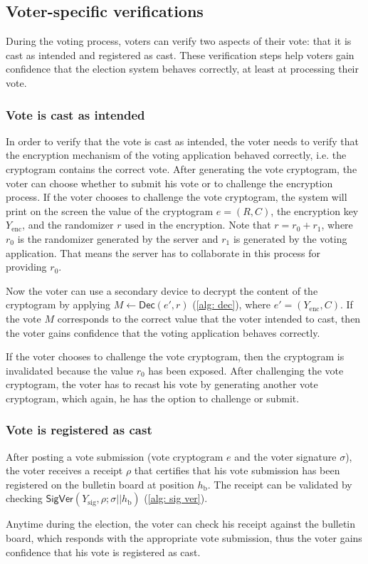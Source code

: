 \subsection{Voter-specific verifications} \label{sec: voter-specific verifications}
During the voting process, voters can verify two aspects of their vote: that it is cast as intended and registered as cast. These verification steps help voters gain confidence that the election system behaves correctly, at least at processing their vote.


\subsubsection{Vote is cast as intended}
In order to verify that the vote is cast as intended, the voter needs to verify that the encryption mechanism of the voting application behaved correctly, i.e. the cryptogram contains the correct vote. After generating the vote cryptogram, the voter can choose whether to submit his vote or to challenge the encryption process. If the voter chooses to challenge the vote cryptogram, the system will print on the screen the value of the cryptogram $e = (R, C)$, the encryption key $Y_\mathrm{enc}$, and the randomizer $r$ used in the encryption. Note that \( r = r_0 + r_1 \), where $r_0$ is the randomizer generated by the server and $r_1$ is generated by the voting application. That means the server has to collaborate in this process for providing $r_0$.

Now the voter can use a secondary device to decrypt the content of the cryptogram by applying \( M \gets \mathsf{Dec} (e', r) \) (\cref{alg: dec}), where $e' = (Y_\mathrm{enc}, C)$. If the vote $M$ corresponds to the correct value that the voter intended to cast, then the voter gains confidence that the voting application behaves correctly.

If the voter chooses to challenge the vote cryptogram, then the cryptogram is invalidated because the value $r_0$ has been exposed. After challenging the vote cryptogram, the voter has to recast his vote by generating another vote cryptogram, which again, he has the option to challenge or submit.

 
\subsubsection{Vote is registered as cast} \label{sec: vote is registered as cast}
After posting a vote submission (vote cryptogram $e$ and the voter signature $\sigma$), the voter receives a receipt $\rho$ that certifies that his vote submission has been registered on the bulletin board at position $h_\mathrm{b}$. The receipt can be validated by checking \( \mathsf{SigVer} (Y_\mathrm{sig}, \rho; \sigma || h_\mathrm{b}) \) (\cref{alg: sig ver}).

Anytime during the election, the voter can check his receipt against the bulletin board, which responds with the appropriate vote submission, thus the voter gains confidence that his vote is registered as cast.
